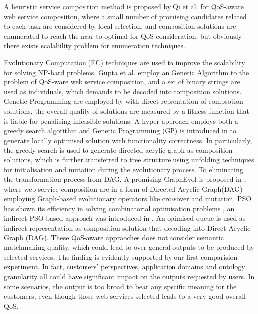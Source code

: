 \documentclass{IEEEtran}
\begin{document}
A heuristic service composition method is proposed by Qi et al. \cite{qi2010combining}for QoS-aware web service composiiton, where a small number of promising candidates related to each task are considered by local selection, and composition solutions are enumerated to reach the near-to-optimal for QoS consideration. but obviously there exists scalability problem for enumeration techniques. 

Evolutionary Computation (EC) techniques are used to improve the scalability for solving NP-hard problems. Gupta et al. \cite{gupta2015optimization} employ an Genetic Algorithm to the problem of QoS-ware web service composition, and a set of binary strings are used as individuals, which demands to be decoded into composition solutions. Genetic Programming are employed by  \cite{yu2013adaptive} with direct reprentation of compsotion solutions, the overall quality of solutions are measured by a fitness function that is liable for penalising infeasible solutions. A hyper approach employs both a greedy search algorithm and Genetic Programming (GP) is introduced in \cite{ma2015hybrid} to generate locally optimised solution with functionality correctness. In particularly, the greedy search is used to generate directed acrylic graph as composition solutions, which is further transferred to tree structure using unfolding techniques for initialisation and mutation during the evolutionary process. To eliminating the transformation process from DAG, A promising GraphEvol is proposed in \cite{da2015graphevol}, where web service composition are in a form of Directed Acyclic Graph(DAG) employing Graph-based evolutionary operators like crossover and mutation. PSO has shown its efficiency in solving combinatorial optimisation problems \cite{fukuyama2008fundamentals}, an indirect PSO-based approach was introduced in \cite{da2016particle}. An opimised queue is used as indirect representation as composition solution that decoding into Direct Acyclic Graph (DAG). These QoS-aware appraoches does not consider semantic matchmaking quality, which could lead to over-general outputs to be produced by selected services, The finding is evidently supported by our first comparision experiment. In fact, customers' perspectives, application domains and ontology granularity all could have significant impact on the outputs requested by users. In some scenarios, the output is too broad to bear any specific meaning for the customers, even though those web services selected leads to a very good overall QoS.
\end{document}
